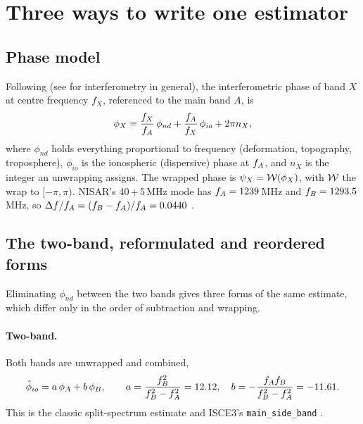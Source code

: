 \section{Three ways to write one estimator}
\label{sec:theory}

\subsection{Phase model}
Following \citet{gomba2016toward} (see \citet{rosen2000synthetic} for interferometry in general), the interferometric phase of band $X$ at centre frequency $f_X$, referenced to the
main band $A$, is
\begin{equation}
  \phi_X = \frac{f_X}{f_A}\,\phi_{nd} + \frac{f_A}{f_X}\,\phi_{io} + 2\pi n_X ,
  \label{eq:model}
\end{equation}
where $\phi_{nd}$ holds everything proportional to frequency (deformation, topography, troposphere), $\phi_{io}$ is the
ionospheric (dispersive) phase at $f_A$, and $n_X$ is the integer an unwrapping assigns. The wrapped phase
is $\psi_X = \mathcal{W}(\phi_X)$, with $\mathcal{W}$ the wrap to $[-\pi,\pi)$. NISAR's 40\,+\,5\,MHz mode has $f_A=1239$\,MHz and
$f_B=1293.5$\,MHz, so $\Delta f/f_A = (f_B-f_A)/f_A = 0.0440$ \citep{nisar2018handbook}.

\subsection{The two-band, reformulated and reordered forms}
Eliminating $\phi_{nd}$ between the two bands gives three forms of the same estimate, which differ only in the order
of subtraction and wrapping.

\paragraph{Two-band.} Both bands are unwrapped and combined,
\begin{equation}
  \hat\phi_{io} = a\,\phi_A + b\,\phi_B, \qquad a = \frac{f_B^2}{f_B^2-f_A^2} = 12.12,\quad
  b = -\frac{f_Af_B}{f_B^2-f_A^2} = -11.61 .
  \label{eq:twoband}
\end{equation}
This is the classic split-spectrum estimate
\citep{rosen2010measurement,brcic2010estimation,gomba2016toward,fattahi2017insar,liang2019ionospheric} and ISCE3's
\texttt{main\_side\_band} \citep{isce3}.

